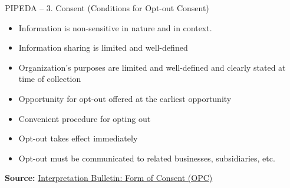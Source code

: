 \documentclass[ignorenonframetext,xcolor=x11names]{beamer}
\begin{document}
\begin{frame}{PIPEDA -- 3. Consent \small (Conditions for Opt-out Consent)}
\begin{itemize}
   \item Information is non-sensitive in nature and in context.
   \item Information sharing is limited and well-defined
   \item Organization's purposes are limited and well-defined and clearly stated at time of collection
   \item Opportunity for opt-out offered at the earliest opportunity
   \item Convenient procedure for opting out
   \item Opt-out takes effect immediately
   \item Opt-out must be communicated to related businesses, subsidiaries, etc. 
\end{itemize}

\vspace{\baselineskip}
\scriptsize \textbf{Source:} \href{https://www.priv.gc.ca/en/privacy-topics/privacy-laws-in-canada/the-personal-information-protection-and-electronic-documents-act-pipeda/pipeda-compliance-help/pipeda-interpretation-bulletins/interpretations_07_consent/}{Interpretation Bulletin: Form of Consent (OPC)}
\end{frame}
 
\end{document}

